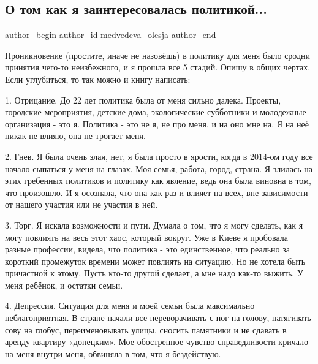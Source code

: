 
 
 
 
 
\subsection{О том как я заинтересовалась политикой...}

\ifcmt
 author_begin
   author_id medvedeva_olesja
 author_end
\fi

Проникновение (простите, иначе не назовёшь) в политику для меня было сродни
принятия чего-то неизбежного, и я прошла все 5 стадий. Опишу в общих чертах.
Если углубиться, то так можно и книгу написать:

1. Отрицание. До 22 лет политика была от меня сильно далека. Проекты, городские
мероприятия, детские дома, экологические субботники и молодежные организация -
это я. Политика - это не я, не про меня, и на оно мне на. Я на неё никак не
влияю, она не трогает меня. 

2. Гнев. Я была очень злая, нет, я была просто в ярости, когда в 2014-ом году
все начало сыпаться у меня на глазах. Моя семья, работа, город, страна. Я
злилась на этих гребенных политиков и политику как явление, ведь она была
виновна в том, что произошло. И я осознала, что она как раз и влияет на всех,
вне зависимости от нашего участия или не участия в ней.

3. Торг. Я искала возможности и пути. Думала о том, что я могу сделать, как я
могу повлиять на весь этот хаос, который вокруг. Уже в Киеве я пробовала разные
профессии, видела, что политика - это единственное, что реально за короткий
промежуток времени может повлиять на ситуацию. Но не хотела быть причастной к
этому. Пусть кто-то другой сделает, а мне надо как-то выжить. У меня ребёнок, и
остатки семьи.

4. Депрессия. Ситуация для меня и моей семьи была максимально неблагоприятная.
В стране начали все переворачивать с ног на голову, натягивать сову на глобус,
переименовывать улицы, сносить памятники и не сдавать в аренду квартиру
«донецким». Мое обостренное чувство справедливости кричало на меня внутри меня,
обвиняла в том, что я бездействую.

